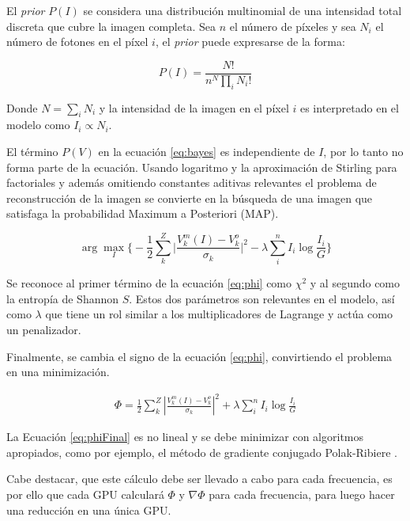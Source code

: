 El \textit{prior} $P(I)$ se considera una distribución multinomial de una intensidad total discreta que cubre la imagen completa. Sea $n$ el número de píxeles y sea $N_{i}$ el número de fotones en el píxel $i$, el \textit{prior} puede expresarse de la forma:

\begin{equation}
P(I) = \frac{N!}{n^N\prod_i{N_i!}} 
\label{eq:imageProb}
\end{equation}

Donde $N=\sum_i N_{i}$ y la intensidad de la imagen en el píxel $i$ es interpretado en el modelo como $I_{i} \propto N_{i}$.

El término $P(V)$ en la ecuación \ref{eq:bayes} es independiente de $I$, por lo tanto no forma parte de la ecuación. Usando logaritmo y la aproximación de Stirling para factoriales y además omitiendo constantes aditivas relevantes el problema de reconstrucción de la imagen se convierte en la búsqueda de una imagen que satisfaga la probabilidad Maximum a Posteriori (MAP).

\begin{equation}
\arg \max_{I} \biggl\{
            -\frac{1}{2} \sum_k^{Z}{ \biggl| \frac{V^m_k(I)-V^o_k}{\sigma_k}  \biggr|^2 }-
            \lambda \sum_i^{n}{I_i \log{\frac{I_i}{G}}}
            \biggr\}
\label{eq:phi}
\end{equation} 

Se reconoce al primer término de la ecuación \ref{eq:phi} como $\chi^{2}$ y al segundo como la entropía de Shannon $S$. Estos dos parámetros son relevantes en el modelo, así como $\lambda$ que tiene un rol similar a los multiplicadores de Lagrange y actúa como un penalizador.

Finalmente, se cambia el signo de la ecuación \ref{eq:phi}, convirtiendo el problema en una minimización.

\begin{align}
\label{eq:phiFinal}
 \Phi = \frac{1}{2}\sum_k^{Z}{{|\frac{V^m_k(I)-V^o_k}{\sigma_k}|^2} + \lambda \sum_i^{n}{I_i \log{\frac{I_i}{G}}}}
\end{align}


La Ecuación \ref{eq:phiFinal} es no lineal y se debe minimizar con algoritmos apropiados, como por ejemplo, el método de gradiente conjugado Polak-Ribiere \citep{polak}.

Cabe destacar, que este cálculo debe ser llevado a cabo para cada frecuencia, es por ello que cada GPU calculará $\Phi$ y $\nabla\Phi$ para cada frecuencia, para luego hacer una reducción en una única GPU.

